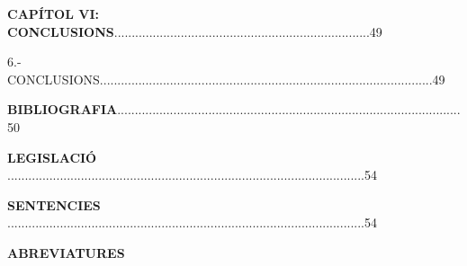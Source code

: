 \documentclass[12pt]{article}
\begin{document}
\vspace{\baselineskip}

\vspace{\baselineskip}
\begin{justify}
\textbf{CAPÍTOL VI: CONCLUSIONS}.........................................................................49
\end{justify}\par


\vspace{\baselineskip}

\vspace{\baselineskip}
\begin{justify}
6.- CONCLUSIONS...............................................................................................49
\end{justify}\par


\vspace{\baselineskip}

\vspace{\baselineskip}
\begin{justify}
\textbf{BIBLIOGRAFIA}..................................................................................................50
\end{justify}\par


\vspace{\baselineskip}

\vspace{\baselineskip}
\begin{justify}
\textbf{LEGISLACIÓ }......................................................................................................54
\end{justify}\par


\vspace{\baselineskip}

\vspace{\baselineskip}
\begin{justify}
\textbf{SENTENCIES }......................................................................................................54
\end{justify}\par


\vspace{\baselineskip}
\begin{Center}
{\fontsize{16pt}{19.2pt}\selectfont \textbf{ABREVIATURES}\par}
\end{Center}\par
\end{document}
